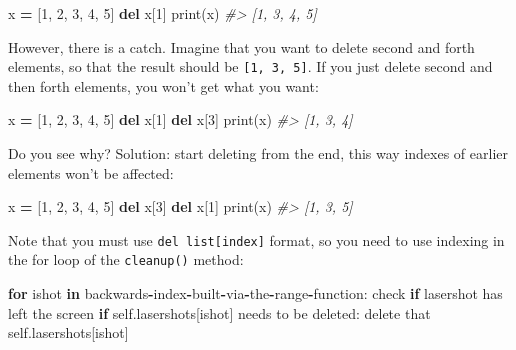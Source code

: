 \documentclass[
]{book}
\newenvironment{Shaded}{\begin{snugshade}}{\end{snugshade}}
\newcommand{\BuiltInTok}[1]{#1}
\newcommand{\CommentTok}[1]{\textcolor[rgb]{0.56,0.35,0.01}{\textit{#1}}}
\newcommand{\ControlFlowTok}[1]{\textcolor[rgb]{0.13,0.29,0.53}{\textbf{#1}}}
\newcommand{\DecValTok}[1]{\textcolor[rgb]{0.00,0.00,0.81}{#1}}
\newcommand{\KeywordTok}[1]{\textcolor[rgb]{0.13,0.29,0.53}{\textbf{#1}}}
\newcommand{\NormalTok}[1]{#1}
\newcommand{\OperatorTok}[1]{\textcolor[rgb]{0.81,0.36,0.00}{\textbf{#1}}}
\newcommand{\VariableTok}[1]{\textcolor[rgb]{0.00,0.00,0.00}{#1}}
\begin{document}
\begin{Shaded}
\begin{Highlighting}[]
\NormalTok{x }\OperatorTok{=}\NormalTok{ [}\DecValTok{1}\NormalTok{, }\DecValTok{2}\NormalTok{, }\DecValTok{3}\NormalTok{, }\DecValTok{4}\NormalTok{, }\DecValTok{5}\NormalTok{]}
\KeywordTok{del}\NormalTok{ x[}\DecValTok{1}\NormalTok{]}
\BuiltInTok{print}\NormalTok{(x)}
\CommentTok{\#\textgreater{} [1, 3, 4, 5]}
\end{Highlighting}
\end{Shaded}

However, there is a catch. Imagine that you want to delete second and forth elements, so that the result should be \texttt{{[}1,\ 3,\ 5{]}}. If you just delete second and then forth elements, you won't get what you want:

\begin{Shaded}
\begin{Highlighting}[]
\NormalTok{x }\OperatorTok{=}\NormalTok{ [}\DecValTok{1}\NormalTok{, }\DecValTok{2}\NormalTok{, }\DecValTok{3}\NormalTok{, }\DecValTok{4}\NormalTok{, }\DecValTok{5}\NormalTok{]}
\KeywordTok{del}\NormalTok{ x[}\DecValTok{1}\NormalTok{]}
\KeywordTok{del}\NormalTok{ x[}\DecValTok{3}\NormalTok{]}
\BuiltInTok{print}\NormalTok{(x)}
\CommentTok{\#\textgreater{} [1, 3, 4]}
\end{Highlighting}
\end{Shaded}

Do you see why? Solution: start deleting from the end, this way indexes of earlier elements won't be affected:

\begin{Shaded}
\begin{Highlighting}[]
\NormalTok{x }\OperatorTok{=}\NormalTok{ [}\DecValTok{1}\NormalTok{, }\DecValTok{2}\NormalTok{, }\DecValTok{3}\NormalTok{, }\DecValTok{4}\NormalTok{, }\DecValTok{5}\NormalTok{]}
\KeywordTok{del}\NormalTok{ x[}\DecValTok{3}\NormalTok{]}
\KeywordTok{del}\NormalTok{ x[}\DecValTok{1}\NormalTok{]}
\BuiltInTok{print}\NormalTok{(x)}
\CommentTok{\#\textgreater{} [1, 3, 5]}
\end{Highlighting}
\end{Shaded}

Note that you must use \texttt{del\ list{[}index{]}} format, so you need to use indexing in the for loop of the \texttt{cleanup()} method:

\begin{Shaded}
\begin{Highlighting}[]
\ControlFlowTok{for}\NormalTok{ ishot }\KeywordTok{in}\NormalTok{ backwards}\OperatorTok{{-}}\NormalTok{index}\OperatorTok{{-}}\NormalTok{built}\OperatorTok{{-}}\NormalTok{via}\OperatorTok{{-}}\NormalTok{the}\OperatorTok{{-}}\BuiltInTok{range}\OperatorTok{{-}}\NormalTok{function:}
\NormalTok{  check }\ControlFlowTok{if}\NormalTok{ lasershot has left the screen}
  \ControlFlowTok{if} \VariableTok{self}\NormalTok{.lasershots[ishot] needs to be deleted:}
\NormalTok{    delete that }\VariableTok{self}\NormalTok{.lasershots[ishot]}
\end{Highlighting}
\end{Shaded}
\end{document}
